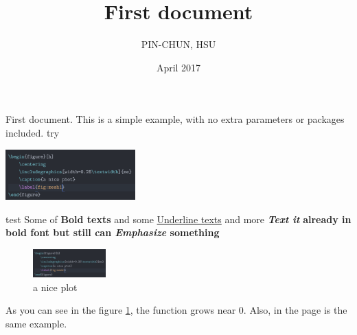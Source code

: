 \documentclass[12pt, a4paper]{article}
\title{First document}
\author{PIN-CHUN, HSU}
\date{April 2017}
\begin{document}
\maketitle

First document. This is a simple example, with no
extra parameters or packages included. %
try

\includegraphics[width=50mm,scale=0.5]{tmp}

test
Some of \textbf{Bold texts}
and some \underline{Underline texts}
and more \textbf{\textit{Text it}}
\textbf{ already in bold font but still can \emph{Emphasize} something}

\begin{figure}[h]
    \centering
    \includegraphics[width=0.25\textwidth]{tmp}
    \caption{a nice plot}
    \label{fig:mesh1}
\end{figure}

As you can see in the figure \ref{fig:mesh1}, the
function grows near 0. Also, in the page \pageref{fig:mesh1}
is the same example.
\end{document}
